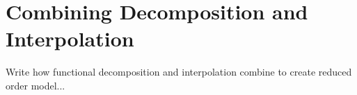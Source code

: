 \section{Combining Decomposition and Interpolation} \label{sec:decomp_and_interp}

Write how functional decomposition and interpolation combine to create reduced order model...